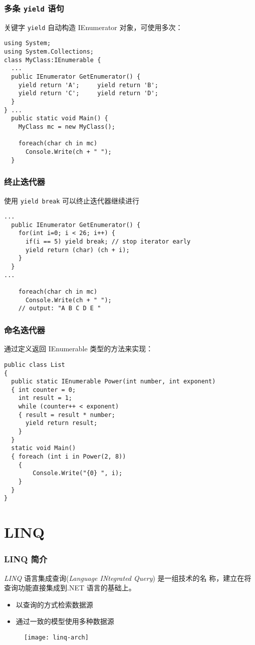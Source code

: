 \begin{frame}[fragile]
\frametitle{多条 \texttt{yield} 语句}
\CJKindent 关键字 \texttt{yield} 自动构造 IEnumerator 对象，可使用多次：
\begin{lstlisting}
using System;
using System.Collections;
class MyClass:IEnumerable {
  ...
  public IEnumerator GetEnumerator() {
    yield return 'A';     yield return 'B';
    yield return 'C';     yield return 'D';
  }
} ...
  public static void Main() {
    MyClass mc = new MyClass();

    foreach(char ch in mc)
      Console.Write(ch + " ");
  }
\end{lstlisting}
\end{frame}

\begin{frame}[fragile]
\frametitle{终止迭代器}
使用 \texttt{yield break} 可以终止迭代器继续进行
\begin{lstlisting}
...
  public IEnumerator GetEnumerator() {
    for(int i=0; i < 26; i++) {
      if(i == 5) yield break; // stop iterator early
      yield return (char) (ch + i);
    }
  }
...

    foreach(char ch in mc)
      Console.Write(ch + " ");
    // output: "A B C D E "
\end{lstlisting}
\end{frame}

\begin{frame}[fragile]
\frametitle{命名迭代器}
通过定义返回 IEnumerable 类型的方法来实现：
\begin{lstlisting}
public class List
{
  public static IEnumerable Power(int number, int exponent)
  { int counter = 0;
    int result = 1;
    while (counter++ < exponent)
    { result = result * number;
      yield return result;
    }
  }
  static void Main()
  { foreach (int i in Power(2, 8))
    {
        Console.Write("{0} ", i);
    }
  }
}
\end{lstlisting}
\end{frame}

\section{LINQ}
\begin{frame}
\frametitle{LINQ 简介}

\begin{block}{\textit{LINQ}}
  \CJKindent 语言集成查询(\textit{Language INtegrated Query}) 是一组技术的名
  称，建立在将查询功能直接集成到.NET 语言的基础上。
\end{block}

\begin{itemize}
\item 以查询的方式检索数据源
\item 通过一致的模型使用多种数据源
\end{itemize}

\begin{figure}[htbp]
  \centering \texttt{[image: linq-arch]}
\end{figure}
\end{frame}



